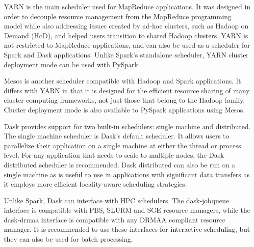 \documentclass{report}
\begin{document}
            YARN is the main scheduler used for MapReduce applications. It was 
            designed in order to decouple resource management from the 
            MapReduce programming model while also addressing issues created 
            by ad-hoc clusters, such as Hadoop on Demand (HoD), and helped 
            users transition to shared Hadoop clusters. YARN is not restricted 
            to MapReduce applications, and can also be used as a scheduler for 
            Spark and Dask applications. Unlike Spark's standalone scheduler, 
            YARN cluster deployment mode can be used with PySpark.
            
            Mesos is another scheduler compatible with Hadoop and Spark 
            applications. It differs with YARN in that it is designed for the
            efficient resource sharing of many cluster computing frameworks,
            not just those that belong to the Hadoop family. Cluster deployment
            mode is also available to PySpark applications using Mesos. 
            
            Dask provides support for two built-in schedulers: single machine
            and distributed. The single machine scheduler is Dask's default
            scheduler. It allows users to parallelize their application on a
            single machine at either the thread or process level. For any 
            application that needs to scale to multiple nodes, the Dask 
            distributed scheduler is recommended. Dask distributed can also be
            run on a single machine as is useful to use in applications with 
            significant data transfers as it employs more efficient 
            locality-aware scheduling strategies. 

            Unlike Spark, Dask can interface with HPC schedulers. The 
            dask-jobqueue interface is compatible with PBS, SLURM and SGE 
            resource managers, while the dask-drmaa interface is compatible 
            with any DRMAA compliant resource manager. It is recommended to use
            these interfaces for interactive scheduling, but they can also be
            used for batch processing.
\end{document}
